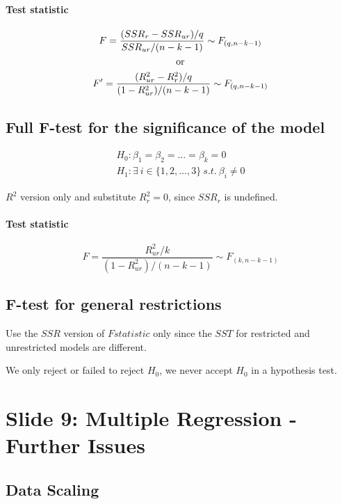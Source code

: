 \documentclass[]{article}
\begin{document}
    	\paragraph{Test statistic}
    	\begin{gather*}
    		F = \frac{(SSR_r - SSR_{ur})/q}{SSR_{ur}/(n-k-1)} \sim F_{(q, n-k-1)} \\
    		\text{{or}} \\
    		F' = \frac{(R^2_{ur} - R^2_r)/q}{(1-R^2_{ur})/(n-k-1)} \sim F_{(q, n-k-1)}
    	\end{gather*}
    	
    	\subsection{Full F-test for the significance of the model}
    	\begin{gather*}
    		H_0: \beta_1 = \beta_2 = \dots = \beta_k = 0 \\
    		H_1: \exists\ i \in \{1, 2, \dots ,3\}\ s.t.\ \beta_i \neq 0
    	\end{gather*}
    	\begin{remark}
    		$R^2$ version only and substitute $R^2_{r} = 0$, since $SSR_{r}$ is undefined.
    	\end{remark}
    	\paragraph{Test statistic}
    	\[
    		F = \frac{R^2_{ur}/k}{(1-R^2_{ur})/(n-k-1)} \sim F_{(k, n-k-1)}
    	\]
    	
    	\subsection{F-test for general restrictions}
    	\begin{remark}
    		Use the $SSR$ version of $Fstatistic$ only since the $SST$ for restricted and unrestricted models are different.
    	\end{remark}
    	\begin{remark}
    		We only reject or failed to reject $H_0$, we never accept $H_0$ in a hypothesis test.
    	\end{remark}
    	
    \section{Slide 9: Multiple Regression - Further Issues}
    	\subsection{Data Scaling}
\end{document}

